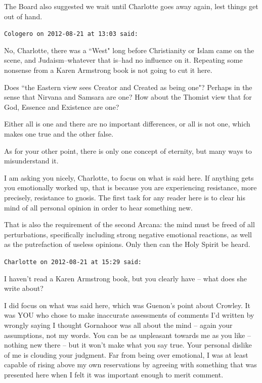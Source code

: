 \begin{footnotesize}
\begin{sffamily}
The Board also suggested we wait until Charlotte goes away again, lest things get out of hand.


\hfill

\texttt{Cologero on 2012-08-21 at 13:03 said: }

No, Charlotte, there was a ``West" long before Christianity or Islam came on the scene, and Judaism–whatever that is–had no influence on it. Repeating some nonsense from a Karen Armstrong book is not going to cut it here.

Does ``the Eastern view sees Creator and Created as being one"? Perhaps in the sense that Nirvana and Samsara are one? How about the Thomist view that for God, Essence and Existence are one?

Either all is one and there are no important differences, or all is not one, which makes one true and the other false.

As for your other point, there is only one concept of eternity, but many ways to misunderstand it.

I am asking you nicely, Charlotte, to focus on what is said here. If anything gets you emotionally worked up, that is because you are experiencing resistance, more precisely, resistance to gnosis. The first task for any reader here is to clear his mind of all personal opinion in order to hear something new.

That is also the requirement of the second Arcana: the mind must be freed of all perturbations, specifically including strong negative emotional reactions, as well as the putrefaction of useless opinions. Only then can the Holy Spirit be heard.


\hfill

\texttt{Charlotte on 2012-08-21 at 15:29 said: }

I haven't read a Karen Armstrong book, but you clearly have – what does she write about? 

I did focus on what was said here, which was Guenon's point about Crowley. It was YOU who chose to make inaccurate assessments of comments I'd written by wrongly saying I thought Gornahoor was all about the mind – again your assumptions, not my words. You can be as unpleasant towards me as you like – nothing new there – but it won't make what you say true. Your personal dislike of me is clouding your judgment. Far from being over emotional, I was at least capable of rising above my own reservations by agreeing with something that was presented here when I felt it was important enough to merit comment. 


\end{sffamily}
\end{footnotesize}
